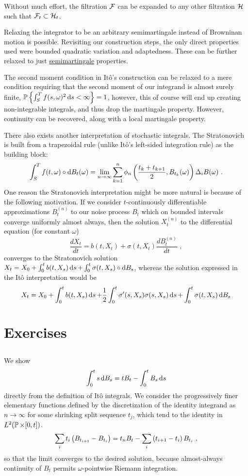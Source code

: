 \documentclass{article}
\begin{document}
Without much effort, the filtration \(\mcF\) can be expanded to any other filtration \(\mcH\) such that \(\mcF_t\subset\mcH_t\).

Relaxing the integrator to be an arbitrary semimartingale instead of Browninan motion is possible. Revisiting our construction steps, the only direct properties used were bounded quadratic variation and adaptedness. These can be further relaxed to just \href{https://en.wikipedia.org/wiki/Semimartingale}{semimartingale} properties.

The second moment condition in It\^{o}'s construction can be relaxed to a mere condition requiring that the second moment of our integrand is almost surely finite, \(\P\ca{\int_S^Tf(s,\omega)^2\d{s}<\infty}=1\), however, this of course will end up creating non-integrable integrals, and thus drop the martingale property. However, continuity can be recovered, along with a local martingale property.

There also exists another interpretation of stochastic integrals. The Stratonovich is built from a trapezoidal rule (unlike It\^{o}'s left-sided integration rule) as the building block:
  \[
\int_S^Tf(t, \omega)\circ \d{B_t(\omega)}=\lim_{n\rightarrow\infty}\sum_{k=1}^n\phi_n\pa{\frac{t_k+t_{k+1}}{2}, B_{t_k}(\omega)}\Delta_i B(\omega)\,\,.
\]
One reason the Stratonovich interpretation might be more natural is because of the following motivation. If we consider \(t\)-continuously differentiable approximations \(B_t^{(n)}\) to our noise process \(B_t\) which on bounded intervals converge uniformly almost always, then the solution \(X^{(n)}_t\) to the differential equation (for constant \(\omega\))
\[
\frac{d X_t}{dt}=b(t,X_t)+\sigma(t,X_t)\frac{dB_t^{(n)}}{dt}\,\,,
\]
converges to the Stratonovich solution \(X_t=X_0+\int_0^tb(t, X_s)\d{s}+\int_0^t\sigma(t, X_s)\circ\d{B_s}\), whereas the solution expressed in the It\^{o} interpretation would be
\[
  X_t=X_0+\int_0^tb(t, X_s)\d{s}+\frac{1}{2}\int_0^{t}\sigma'(s, X_s)\sigma(s, X_s)\d{s}+\int_0^t\sigma(t, X_s)\d{B_s}
  \]

\section{Exercises}

\subsection{}

We show
\[
  \int_0^t s\d{B_s}=tB_t-\int_0^tB_s\d{s}
\]
directly from the definition of It\^{o} integrals. We consider the progressively finer elementary functions defined by the discretization of the identity integrand as \(n\rightarrow\infty\) for some shrinking split sequence \(t_j\), which tend to the identity in \(L^2(\P\times[0,t])\).
\[
  \sum_it_i\pa{B_{t_{i+1}}-B_{t_{i}}}=  t_nB_t-\sum_i\pa{t_{i+1}-t_{i}}B_{t_i}\,\,,
\]
so that the limit converges to the desired solution, because almost-always continuity of \(B_t\) permits \(\omega\)-pointwise Riemann integration.
\end{document}
